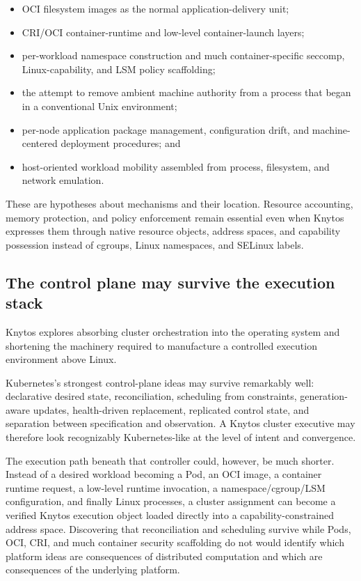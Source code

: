 \begin{itemize}
    \item OCI filesystem images as the normal application-delivery unit;
    \item CRI/OCI container-runtime and low-level container-launch layers;
    \item per-workload namespace construction and much container-specific
        seccomp, Linux-capability, and LSM policy scaffolding;
    \item the attempt to remove ambient machine authority from a process that
        began in a conventional Unix environment;
    \item per-node application package management, configuration drift, and
        machine-centered deployment procedures; and
    \item host-oriented workload mobility assembled from process, filesystem,
        and network emulation.
\end{itemize}

These are hypotheses about mechanisms and their location. Resource accounting,
memory protection, and policy enforcement remain essential even when Knytos
expresses them through native resource objects, address spaces, and capability
possession instead of cgroups, Linux namespaces, and SELinux labels.

\subsection{The control plane may survive the execution stack}

Knytos explores absorbing cluster orchestration into the operating
system and shortening the machinery required to manufacture a controlled
execution environment above Linux.

Kubernetes's strongest control-plane ideas may survive remarkably well:
declarative desired state, reconciliation, scheduling from constraints,
generation-aware updates, health-driven replacement, replicated control
state, and separation between specification and observation. A Knytos
cluster executive may therefore look recognizably Kubernetes-like at the
level of intent and convergence.

The execution path beneath that controller could, however, be much shorter.
Instead of a desired workload becoming a Pod, an OCI image, a container
runtime request, a low-level runtime invocation, a namespace/cgroup/LSM
configuration, and finally Linux processes, a cluster assignment can become
a verified Knytos execution object loaded directly into a
capability-constrained address space. Discovering that reconciliation and
scheduling survive while Pods, OCI, CRI, and much container security
scaffolding do not would identify which platform ideas are consequences of
distributed computation and which are consequences of the underlying platform.

